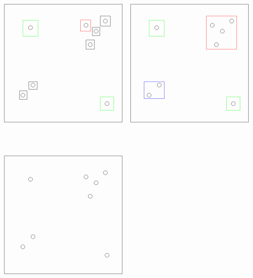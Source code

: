 \documentclass[12pt, a4paper]{article}
\begin{document}
\[
\begin{tikzpicture}
    \begin{scope}
        \draw (-3.5, 3.5) -- (3.5, 3.5);
        \draw (-3.5, -3.5) -- (3.5, -3.5);
        \draw (-3.5, -3.5) -- (-3.5, 3.5);
        \draw (3.5, 3.5) -- (3.5, -3.5);
        
        \draw (2.5, 2.5) circle (0.12);
        \draw (1.35, 2.25) circle (0.12);
        \draw (1.6, 1.1) circle (0.12);
        \draw (1.95, 1.9) circle (0.12);
        \draw (-2.4, -1.9) circle (0.12);
        \draw (-1.8, -1.3) circle (0.12);
        \draw (-1.95, 2.11) circle (0.12);
        \draw (2.6, -2.4) circle (0.12);
        
        \draw (-2.6, -2.15) rectangle (-2.15, -1.64);
        \draw (-2.05, -1.55) rectangle (-1.55, -1.1);
        \draw[green] (2.2, -2.8) rectangle (3, -2);
        \draw (2.2, 2.2) rectangle (2.8, 2.8);
        \draw[red] (1.023, 1.9) rectangle (1.63, 2.57);
        \draw (1.73, 1.64) rectangle (2.17, 2.13);
        \draw (1.35, 0.83) rectangle (1.85, 1.38);
        \draw[green] (-2.4, 1.6) rectangle (-1.5, 2.55);
    \end{scope}
    \begin{scope}[xshift=7.5cm]
        \draw (-3.5, 3.5) -- (3.5, 3.5);
        \draw (-3.5, -3.5) -- (3.5, -3.5);
        \draw (-3.5, -3.5) -- (-3.5, 3.5);
        \draw (3.5, 3.5) -- (3.5, -3.5);
        
        \draw (2.5, 2.5) circle (0.12);
        \draw (1.35, 2.25) circle (0.12);
        \draw (1.6, 1.1) circle (0.12);
        \draw (1.95, 1.9) circle (0.12);
        \draw (-2.4, -1.9) circle (0.12);
        \draw (-1.8, -1.3) circle (0.12);
        \draw (-1.95, 2.11) circle (0.12);
        \draw (2.6, -2.4) circle (0.12);
        
        \draw[blue] (-2.7, -2.1) rectangle (-1.5, -1.1);
        \draw[green] (2.2, -2.8) rectangle (3, -2);
        \draw[red] (1, 0.83) rectangle (2.8, 2.8);
        \draw[green] (-2.4, 1.6) rectangle (-1.5, 2.55);
    \end{scope}
    \begin{scope}[yshift=-9cm]
        \draw (-3.5, 3.5) -- (3.5, 3.5);
        \draw (-3.5, -3.5) -- (3.5, -3.5);
        \draw (-3.5, -3.5) -- (-3.5, 3.5);
        \draw (3.5, 3.5) -- (3.5, -3.5);
        
        \draw (2.5, 2.5) circle (0.12);
        \draw (1.35, 2.25) circle (0.12);
        \draw (1.6, 1.1) circle (0.12);
        \draw (1.95, 1.9) circle (0.12);
        \draw (-2.4, -1.9) circle (0.12);
        \draw (-1.8, -1.3) circle (0.12);
        \draw (-1.95, 2.11) circle (0.12);
        \draw (2.6, -2.4) circle (0.12);
        

\end{scope}
\end{tikzpicture}\]
\end{document}
